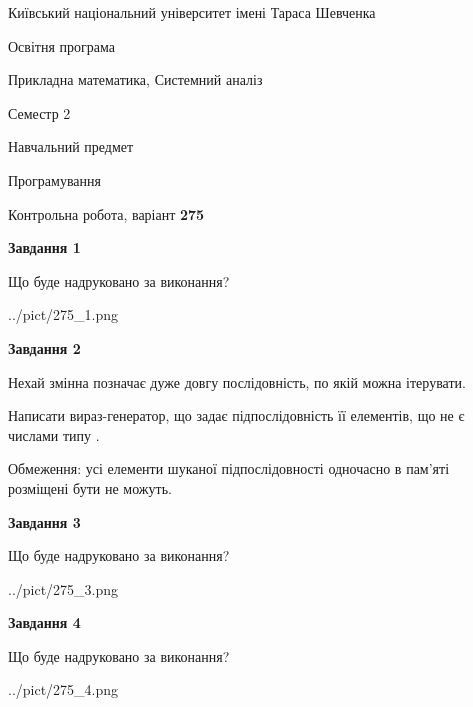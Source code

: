 \documentclass[12pt, ukrainian]{article}
\begin{document}
{{\begin {small}\par
{ \center  Київський національний університет імені Тараса Шевченка \par}
{\parbox {5 cm}{Освітня програма \hfill}{\parbox {8 cm}{Прикладна математика, Системний аналіз \hfill}}\parbox {5 cm}{\hfill Семестр 2}}\par
{\parbox {5 cm} {Навчальний предмет \hfill}\parbox {7 cm}{Програмування \hfill}\parbox {6cm}{\hfill}\par}\vspace{-7pt} \end{small}}{\center Контрольна робота, варіант  \No \textbf
{ 275 }\par}}
{
\begin {large}
{\begin {center}\textbf{Завдання 1}\end {center}}\par
Що буде надруковано за виконання?\par\par
\begin{center}
	{../pict/275_1.png}
\end{center}
\newpage

{\begin {center}\textbf{Завдання 2}\end {center}}\par
Нехай змінна  позначає дуже довгу послідовність, по якій можна ітерувати.

Написати вираз-генератор, що задає підпослідовність її елементів, що не є числами типу .

Обмеження: усі елементи шуканої підпослідовності одночасно в пам'яті розміщені бути не можуть.\par
\newpage

{\begin {center}\textbf{Завдання 3}\end {center}}\par
Що буде надруковано за виконання?\par
\begin{center}
	{../pict/275_3.png}
\end{center}
\newpage

{\begin {center}\textbf{Завдання 4}\end {center}}\par
Що буде надруковано за виконання?\par
\begin{center}
	{../pict/275_4.png}
\end{center}
\newpage


\end{large}}
\end{document}
